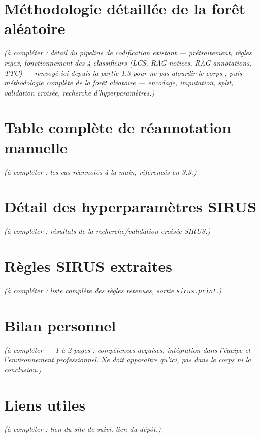\documentclass[
]{rapportCS}
\begin{document}
\section{Méthodologie détaillée de la forêt
aléatoire}\label{annexe-pipeline}

\emph{(à compléter : détail du pipeline de codification existant ---
prétraitement, règles regex, fonctionnement des 4 classifieurs (LCS,
RAG-notices, RAG-annotations, TTC) --- renvoyé ici depuis la partie 1.3
pour ne pas alourdir le corps ; puis méthodologie complète de la forêt
aléatoire --- encodage, imputation, split, validation croisée, recherche
d'hyperparamètres.)}

\section{Table complète de réannotation
manuelle}\label{table-compluxe8te-de-ruxe9annotation-manuelle}

\emph{(à compléter : les cas réannotés à la main, référencés en 3.3.)}

\section{Détail des hyperparamètres
SIRUS}\label{duxe9tail-des-hyperparamuxe8tres-sirus}

\emph{(à compléter : résultats de la recherche/validation croisée
SIRUS.)}

\section{Règles SIRUS extraites}\label{ruxe8gles-sirus-extraites}

\emph{(à compléter : liste complète des règles retenues, sortie
\texttt{sirus.print}.)}

\section{Bilan personnel}\label{bilan-personnel}

\emph{(à compléter --- 1 à 2 pages : compétences acquises, intégration
dans l'équipe et l'environnement professionnel. Ne doit apparaître
qu'ici, pas dans le corps ni la conclusion.)}

\section{Liens utiles}\label{liens-utiles}

\emph{(à compléter : lien du site de suivi, lien du dépôt.)}
\end{document}
